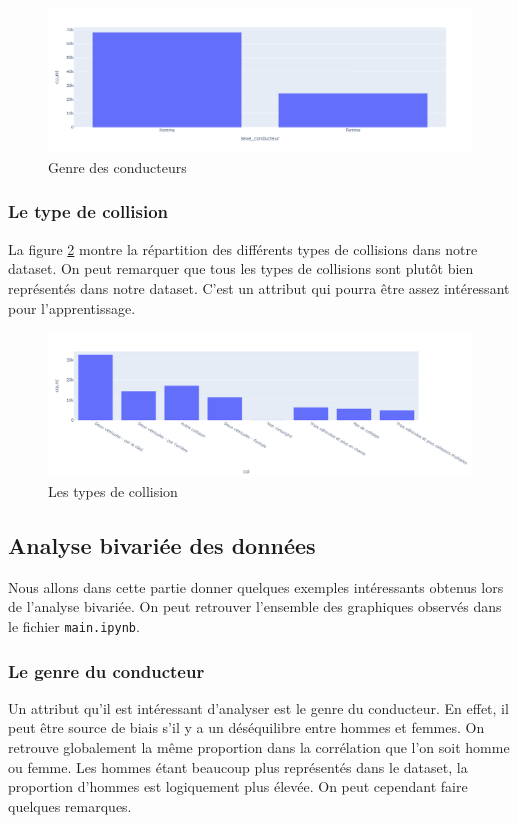 \documentclass{article}
\begin{document}
    \begin{figure}[ht]
        \centering
        \includegraphics[width=12cm]{./img/sexe.png}
        \caption{Genre des conducteurs}\label{fig:fig_genre}
    \end{figure}

    \subsubsection{Le type de collision}
    La figure \ref{fig:fig_col} montre la répartition des différents types de collisions dans notre dataset. On peut 
    remarquer que tous les types de collisions sont plutôt bien représentés dans notre dataset. C'est un attribut qui 
    pourra être assez intéressant pour l'apprentissage.

    \begin{figure}[ht]
        \centering
        \includegraphics[width=12cm]{./img/col.png}
        \caption{Les types de collision}\label{fig:fig_col}
    \end{figure}

    \subsection{Analyse bivariée des données}
    Nous allons dans cette partie donner quelques exemples intéressants obtenus lors de l'analyse bivariée. On 
    peut retrouver l'ensemble des graphiques observés dans le fichier \texttt{main.ipynb}.

    \subsubsection{Le genre du conducteur}
    Un attribut qu'il est intéressant d'analyser est le genre du conducteur. En effet, il peut être source de biais 
    s'il y a un déséquilibre entre hommes et femmes.
    On retrouve globalement la même proportion dans la corrélation que l'on soit homme ou femme. Les hommes étant 
    beaucoup plus représentés dans le dataset, la proportion d'hommes est logiquement plus élevée. On peut cependant 
    faire quelques remarques. 
    
\end{document}
